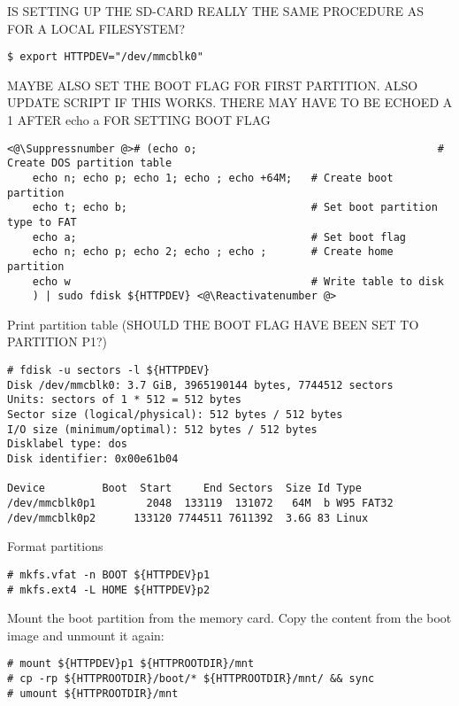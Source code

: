 IS SETTING UP THE SD-CARD REALLY THE SAME PROCEDURE AS FOR A LOCAL FILESYSTEM?

\begin{lstlisting}[]
$ export HTTPDEV="/dev/mmcblk0"
\end{lstlisting}
\FloatBarrier
\vspace{-5mm}

MAYBE ALSO SET THE BOOT FLAG FOR FIRST PARTITION. ALSO UPDATE SCRIPT IF THIS
WORKS. THERE MAY HAVE TO BE ECHOED A 1 AFTER echo a FOR SETTING BOOT FLAG
\begin{lstlisting}[]
<@\Suppressnumber @># (echo o;                                      # Create DOS partition table
    echo n; echo p; echo 1; echo ; echo +64M;   # Create boot partition
    echo t; echo b;                             # Set boot partition type to FAT
    echo a;                                     # Set boot flag
    echo n; echo p; echo 2; echo ; echo ;       # Create home partition
    echo w                                      # Write table to disk
    ) | sudo fdisk ${HTTPDEV} <@\Reactivatenumber @>
\end{lstlisting}
\FloatBarrier
\vspace{-5mm}

Print partition table (SHOULD THE BOOT FLAG HAVE BEEN SET TO PARTITION P1?)
\begin{lstlisting}[]
# fdisk -u sectors -l ${HTTPDEV}
Disk /dev/mmcblk0: 3.7 GiB, 3965190144 bytes, 7744512 sectors
Units: sectors of 1 * 512 = 512 bytes
Sector size (logical/physical): 512 bytes / 512 bytes
I/O size (minimum/optimal): 512 bytes / 512 bytes
Disklabel type: dos
Disk identifier: 0x00e61b04

Device         Boot  Start     End Sectors  Size Id Type
/dev/mmcblk0p1        2048  133119  131072   64M  b W95 FAT32
/dev/mmcblk0p2      133120 7744511 7611392  3.6G 83 Linux
\end{lstlisting}
\FloatBarrier
\vspace{-5mm}

Format partitions
\begin{lstlisting}[]
# mkfs.vfat -n BOOT ${HTTPDEV}p1
# mkfs.ext4 -L HOME ${HTTPDEV}p2
\end{lstlisting}
\FloatBarrier
\vspace{-5mm}






Mount the boot partition from the memory card. Copy the content from the
boot image and unmount it again:
\begin{lstlisting}[]
# mount ${HTTPDEV}p1 ${HTTPROOTDIR}/mnt
# cp -rp ${HTTPROOTDIR}/boot/* ${HTTPROOTDIR}/mnt/ && sync
# umount ${HTTPROOTDIR}/mnt
\end{lstlisting}
\FloatBarrier
\vspace{-5mm}

